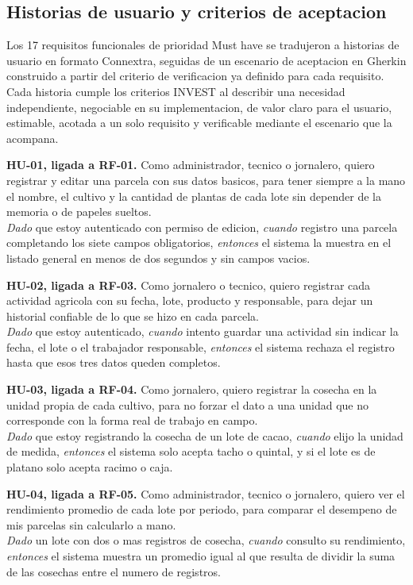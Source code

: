 \documentclass[11pt,a4paper]{article}
\begin{document}
\subsection{Historias de usuario y criterios de aceptacion}

Los 17 requisitos funcionales de prioridad Must have se tradujeron a historias de usuario en formato Connextra, seguidas de un escenario de aceptacion en Gherkin construido a partir del criterio de verificacion ya definido para cada requisito. Cada historia cumple los criterios INVEST al describir una necesidad independiente, negociable en su implementacion, de valor claro para el usuario, estimable, acotada a un solo requisito y verificable mediante el escenario que la acompana.

\newcommand{\hu}[3]{\par\smallskip\noindent\textbf{#1, ligada a #2.} #3\par}

\hu{HU-01}{RF-01}{Como administrador, tecnico o jornalero, quiero registrar y editar una parcela con sus datos basicos, para tener siempre a la mano el nombre, el cultivo y la cantidad de plantas de cada lote sin depender de la memoria o de papeles sueltos.\\
\textit{Dado} que estoy autenticado con permiso de edicion, \textit{cuando} registro una parcela completando los siete campos obligatorios, \textit{entonces} el sistema la muestra en el listado general en menos de dos segundos y sin campos vacios.}

\hu{HU-02}{RF-03}{Como jornalero o tecnico, quiero registrar cada actividad agricola con su fecha, lote, producto y responsable, para dejar un historial confiable de lo que se hizo en cada parcela.\\
\textit{Dado} que estoy autenticado, \textit{cuando} intento guardar una actividad sin indicar la fecha, el lote o el trabajador responsable, \textit{entonces} el sistema rechaza el registro hasta que esos tres datos queden completos.}

\hu{HU-03}{RF-04}{Como jornalero, quiero registrar la cosecha en la unidad propia de cada cultivo, para no forzar el dato a una unidad que no corresponde con la forma real de trabajo en campo.\\
\textit{Dado} que estoy registrando la cosecha de un lote de cacao, \textit{cuando} elijo la unidad de medida, \textit{entonces} el sistema solo acepta tacho o quintal, y si el lote es de platano solo acepta racimo o caja.}

\hu{HU-04}{RF-05}{Como administrador, tecnico o jornalero, quiero ver el rendimiento promedio de cada lote por periodo, para comparar el desempeno de mis parcelas sin calcularlo a mano.\\
\textit{Dado} un lote con dos o mas registros de cosecha, \textit{cuando} consulto su rendimiento, \textit{entonces} el sistema muestra un promedio igual al que resulta de dividir la suma de las cosechas entre el numero de registros.}
\end{document}
